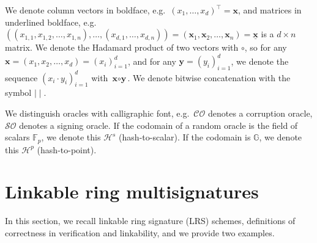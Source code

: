 \documentclass{mrl}
\theoremstyle{plain}
\theoremstyle{definition}
\begin{document}
We denote column vectors in boldface, e.g.\ $(x_1, \ldots, x_d)^\top = \textbf{x}$, and matrices in underlined boldface, e.g.\ $((x_{1,1}, x_{1,2}, \ldots, x_{1,n}), \ldots, (x_{d,1}, \ldots, x_{d,n})) = (\textbf{x}_1, \textbf{x}_2, \ldots, \textbf{x}_n) = \underline{\textbf{x}}$ is a $d\times n$ matrix. We denote the Hadamard product of two vectors with $\circ$, so for any $\textbf{x} = (x_1, x_2, \ldots, x_d) = (x_i)_{i=1}^{d}$, and for any $\textbf{y} = (y_i)_{i=1}^{d}$, we denote the sequence $(x_i \cdot y_i)_{i=1}^{d}$ with $\textbf{x} \circ \textbf{y}$. We denote bitwise concatenation with the symbol $\mid \mid$.

We distinguish oracles with calligraphic font, e.g.\ $\mathcal{CO}$ denotes a corruption oracle, $\mathcal{SO}$ denotes a signing oracle. If the codomain of a random oracle is the field of scalars $\mathbb{F}_p$, we denote this $\mathcal{H}^s$ (hash-to-scalar). If the codomain is $\mathbb{G}$, we denote this $\mathcal{H}^p$ (hash-to-point).


\section{Linkable ring multisignatures}\label{sec:lrs-and-exs}
In this section, we recall linkable ring signature (LRS) schemes, definitions of correctness in verification and linkability, and we provide two examples. 
\end{document}
